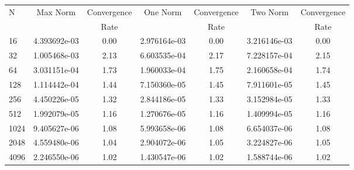 \documentclass[12pt]{article}
\begin{document}
	\begin{tabular}{l|c|c|c|c|c|c}
		N&Max Norm&Convergence&One Norm&Convergence&Two Norm&Convergence\\
		&&Rate&&Rate&&Rate\\
		\hline
		16&4.393692e-03&0.00&2.976164e-03&0.00&3.216146e-03&0.00\\
		\hline
		32&1.005468e-03&2.13&6.603535e-04&2.17&7.228157e-04&2.15\\
		\hline
		64&3.031151e-04&1.73&1.960033e-04&1.75&2.160658e-04&1.74\\
		\hline
		128&1.114442e-04&1.44&7.150360e-05&1.45&7.911601e-05&1.45\\
		\hline
		256&4.450226e-05&1.32&2.844186e-05&1.33&3.152984e-05&1.33\\
		\hline
		512&1.992079e-05&1.16&1.270676e-05&1.16&1.409994e-05&1.16\\
		\hline
		1024&9.405627e-06&1.08&5.993658e-06&1.08&6.654037e-06&1.08\\
		\hline
		2048&4.559480e-06&1.04&2.904072e-06&1.05&3.224827e-06&1.05\\
		\hline
		4096&2.246550e-06&1.02&1.430547e-06&1.02&1.588744e-06&1.02\\
	\end{tabular}
\end{document}
